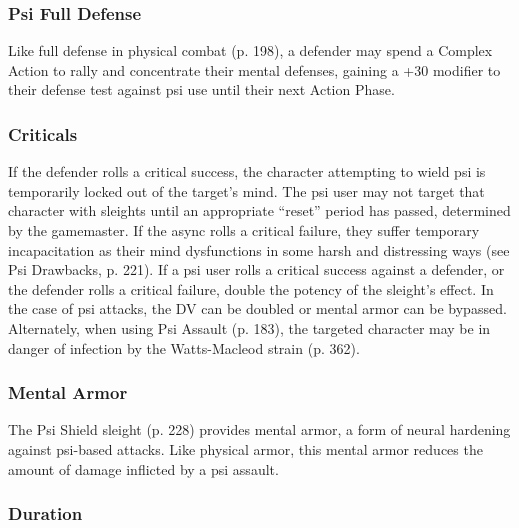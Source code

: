 \subsubsection{Psi Full Defense} 

Like full defense in physical combat (p. 198), a defender may spend a Complex Action to rally and concentrate their mental defenses, gaining a +30 modifier to their defense test against psi use until their next Action Phase. 

\subsubsection{Criticals} 

If the defender rolls a critical success, the character attempting to wield psi is temporarily locked out of the target’s mind. The psi user may not target that character with sleights until an appropriate “reset” period has passed, determined by the gamemaster. If the async rolls a critical failure, they suffer temporary incapacitation as their mind dysfunctions in some harsh and distressing ways (see Psi Drawbacks, p. 221). If a psi user rolls a critical success against a defender, or the defender rolls a critical failure, double the potency of the sleight’s effect. In the case of psi attacks, the DV can be doubled or mental armor can be bypassed. Alternately, when using Psi Assault (p. 183), the targeted character may be in danger of infection by the Watts-Macleod strain (p. 362). 

\subsubsection{Mental Armor} 

The Psi Shield sleight (p. 228) provides mental armor, a form of neural hardening against psi-based attacks. Like physical armor, this mental armor reduces the amount of damage inflicted by a psi assault. 

\subsubsection{Duration} 

